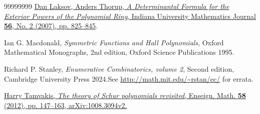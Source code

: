 \documentclass
[numbers=enddot,12pt,final,onecolumn,notitlepage,english]{scrartcl}%
\theoremstyle{definition}
\begin{document}
\begin{thebibliography}{99999999}
\href{https://www.jstor.org/stable/24902713}{Dan
Laksov, Anders Thorup, \textit{A Determinantal Formula for the Exterior Powers
of the Polynomial Ring}, Indiana University Mathematics Journal \textbf{56},
No. 2 (2007), pp. 825--845}.

Ian G. Macdonald, \textit{Symmetric Functions and
Hall Polynomials}, Oxford Mathematical Monographs, 2nd edition, Oxford Science
Publications 1995.

Richard P. Stanley, \textit{Enumerative
Combinatorics, volume 2}, Second edition, Cambridge University Press
2024.\newline See \url{http://math.mit.edu/~rstan/ec/} for errata.

\href{https://arxiv.org/abs/1008.3094v2}{Harry
Tamvakis, \textit{The theory of Schur polynomials revisited}, Enseign. Math.
\textbf{58} (2012), pp. 147--163, arXiv:1008.3094v2.}
\end{thebibliography}
\end{document}
